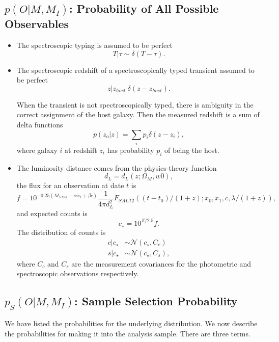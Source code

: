 \documentclass[preprint,3p]{elsarticle}
\begin{document}
\subsection{$p(O| M, M_I)$: Probability of All Possible Observables}
\begin{itemize}
\item The spectroscopic typing is assumed to be perfect
\begin{equation}
T | \tau \sim \delta (T-\tau).
\label{typepdf:eqn}
\end{equation}

\item The spectroscopic redshift of a spectroscopically typed transient assumed to be perfect
\begin{equation}
z | z_{host} ~ \delta (z-z_{host}).
\end{equation}

When the transient is not spectroscopically typed, there is ambiguity in the correct assignment of the host galaxy.
Then the measured redshift is a sum of delta functions
\begin{equation}
p(z_o|z) = \sum_i p_i \delta(z-z_i),
\end{equation}
where galaxy $i$ at
redshift $z_i$ has probability $p_i$ of being
the host.  

\item  The luminosity distance comes from the physics-theory function
\begin{equation}
d_L = d_L(z; \Omega_M, w0),
\end{equation}
the flux for an observation at date $t$ is
\begin{equation}
f = 10^{-0.25 \left(M_{SNIa} - \alpha x_1 + \beta c \right)}\frac{1}{4\pi d_L^2} F_{SALT2}((t-t_0)/(1+z); x_0,  x_1, c, \lambda/(1+z)),
\end{equation}
and expected counts is
\begin{equation}
c_\star = 10^{Z/2.5}f.
\end{equation}
The distribution of counts is 
\begin{align*}
c | c_\star &\sim \mathcal{N}(c_\star, C_c)\\
s | c_\star &\sim \mathcal{N}(c_\star, C_s),
\end{align*}
where $C_c$ and $C_s$ are the measurement covariances for the photometric and spectroscopic observations respectively.

\end{itemize}

\subsection{$p_S(O|M, M_I)$: Sample Selection Probability}
We have listed the probabilities for the underlying distribution.  We now describe the probabilities for making it into the analysis sample.
There are three terms.
\end{document}
